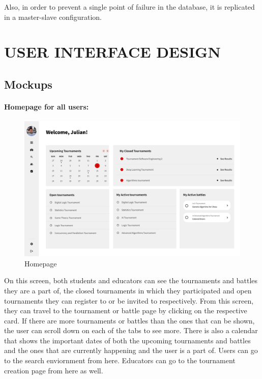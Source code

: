 \documentclass{article}
\begin{document}
Also, in order to prevent a single point of failure in the database, it is replicated in a master-slave configuration.

\section{USER INTERFACE DESIGN}

\subsection{Mockups}

\paragraph{Homepage for all users:}

\begin{figure}[H]
    \centering
    \includegraphics[width=1\textwidth]{images/UI/Homepage.png}
    \caption{Homepage}
    \label{fig:Homepage}
\end{figure}

On this screen, both students and educators can see the tournaments and battles 
they are a part of, the closed tournaments in which they participated and open 
tournaments they can register to or be invited to respectively. From this screen, they
can travel to the tournament or battle page by clicking on the respective card. If there
are more tournaments or battles than the ones that can be shown, the user can scroll down
on each of the tabs to see more. There is also a calendar that shows the important dates
of both the upcoming tournaments and battles and the ones that are currently happening and
the user is a part of. Users can go to the search enviornment from here. 
Educators can go to the tournament creation page from here as well.
\end{document}
